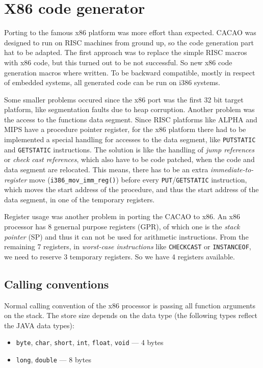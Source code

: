 \section{X86 code generator}

Porting to the famous x86 platform was more effort than
expected. CACAO was designed to run on RISC machines from ground up,
so the code generation part hat to be adapted. The first approach was
to replace the simple RISC macros with x86 code, but this turned out
to be not successful. So new x86 code generation macros where
written. To be backward compatible, mostly in respect of embedded
systems, all generated code can be run on i386 systems.

Some smaller problems occured since the x86 port was the first 32 bit
target platform, like segmentation faults due to heap
corruption. Another problem was the access to the functions data
segment. Since RISC platforms like ALPHA and MIPS have a procedure
pointer register, for the x86 platform there had to be implemented a
special handling for accesses to the data segment, like
\texttt{PUTSTATIC} and \texttt{GETSTATIC} instructions. The solution
is like the handling of \textit{jump references} or \textit{check cast
references}, which also have to be code patched, when the code and
data segment are relocated. This means, there has to be an extra
\textit{immediate-to-register} move (\texttt{i386\_mov\_imm\_reg()})
before every \texttt{PUT}/\texttt{GETSTATIC} instruction, which moves
the start address of the procedure, and thus the start address of the
data segment, in one of the temporary registers.

Register usage was another problem in porting the CACAO to x86. An x86
processor has 8 genernal purpose registers (GPR), of which one is the
\textit{stack pointer} (SP) and thus it can not be used for arithmetic
instructions. From the remaining 7 registers, in \textit{worst-case
instructions} like \texttt{CHECKCAST} or \texttt{INSTANCEOF}, we need
to reserve 3 temporary registers. So we have 4 registers available.


\subsection{Calling conventions}

Normal calling convention of the x86 processor is passing all function
arguments on the stack. The store size depends on the data type (the
following types reflect the JAVA data types):

\begin{itemize}
\item \texttt{byte}, \texttt{char}, \texttt{short}, \texttt{int}, 
      \texttt{float}, \texttt{void} --- 4 bytes
\item \texttt{long}, \texttt{double} --- 8 bytes
\end{itemize}

